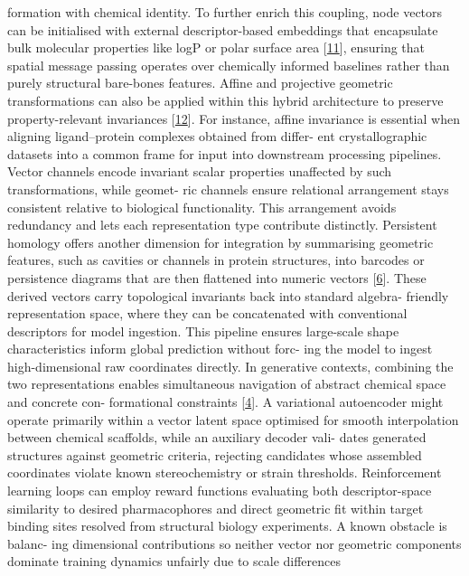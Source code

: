 \documentclass[
]{article}
\begin{document}
formation with chemical identity. To further enrich this coupling, node
vectors can be initialised with external descriptor-based embeddings
that encapsulate bulk molecular properties like logP or polar surface
area {[}\protect\hyperlink{_bookmark51}{11}{]}, ensuring that spatial
message passing operates over chemically informed baselines rather than
purely structural bare-bones features. Affine and projective geometric
transformations can also be applied within this hybrid architecture to
preserve property-relevant invariances
{[}\protect\hyperlink{_bookmark52}{12}{]}. For instance, affine
invariance is essential when aligning ligand--protein complexes obtained
from differ- ent crystallographic datasets into a common frame for input
into downstream processing pipelines. Vector channels encode invariant
scalar properties unaffected by such transformations, while geomet- ric
channels ensure relational arrangement stays consistent relative to
biological functionality. This arrangement avoids redundancy and lets
each representation type contribute distinctly. Persistent homology
offers another dimension for integration by summarising geometric
features, such as cavities or channels in protein structures, into
barcodes or persistence diagrams that are then flattened into numeric
vectors {[}\protect\hyperlink{_bookmark46}{6}{]}. These derived vectors
carry topological invariants back into standard algebra- friendly
representation space, where they can be concatenated with conventional
descriptors for model ingestion. This pipeline ensures large-scale shape
characteristics inform global prediction without forc- ing the model to
ingest high-dimensional raw coordinates directly. In generative
contexts, combining the two representations enables simultaneous
navigation of abstract chemical space and concrete con- formational
constraints {[}\protect\hyperlink{_bookmark44}{4}{]}. A variational
autoencoder might operate primarily within a vector latent space
optimised for smooth interpolation between chemical scaffolds, while an
auxiliary decoder vali- dates generated structures against geometric
criteria, rejecting candidates whose assembled coordinates violate known
stereochemistry or strain thresholds. Reinforcement learning loops can
employ reward functions evaluating both descriptor-space similarity to
desired pharmacophores and direct geometric fit within target binding
sites resolved from structural biology experiments. A known obstacle is
balanc- ing dimensional contributions so neither vector nor geometric
components dominate training dynamics unfairly due to scale differences
\end{document}
